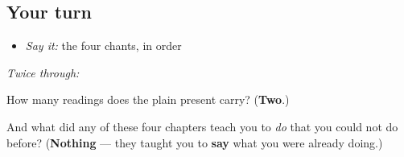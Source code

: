 \subsection*{Your turn}
\begin{itemize}
\raggedright
  \item \emph{Say it:} the four chants, in order
\end{itemize}

\emph{Twice through:}

\begin{tcolorbox}[breakable,colback=teal!4,colframe=teal!35!black,title={Before you move on}]
How many readings does the plain present carry? (\textbf{Two}.)

And what did any of these four chapters teach you to \emph{do} that you could not do before? (\textbf{Nothing} — they taught you to \textbf{say} what you were already doing.)
\end{tcolorbox}
